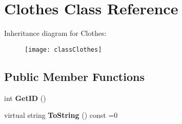 \hypertarget{classClothes}{}\section{Clothes Class Reference}
\label{classClothes}
Inheritance diagram for Clothes\+:\begin{figure}[H]
\begin{center}
\leavevmode
\texttt{[image: classClothes]}
\end{center}
\end{figure}
\subsection*{Public Member Functions}
\begin{DoxyCompactItemize}
\item 
\mbox{\label{classClothes_a3f6dac172f333126d19010f85ec44e4c}} 
int {\bfseries Get\+ID} ()
\item 
\mbox{\label{classClothes_a953d143394e9a2c007ab0c3a638973cf}} 
virtual string {\bfseries To\+String} () const =0
\end{DoxyCompactItemize}
